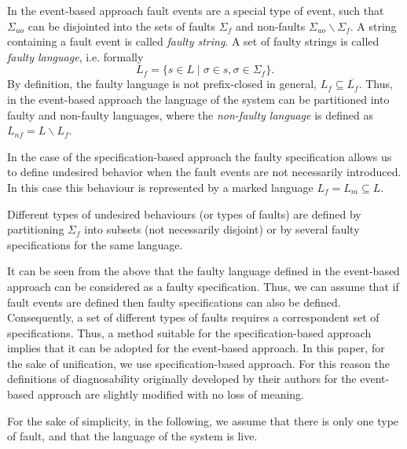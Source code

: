 \documentclass[a4paper, 10pt, conference]{ieeeconf} \IEEEoverridecommandlockouts
\begin{document}
In the event-based approach fault events are a special type of event, such that
$\Sigma_{uo}$ can be disjointed into the sets of faults $\Sigma_f$ and
non-faults $\Sigma_{uo}\backslash \Sigma_f$. A string containing a fault event
is called \emph{faulty string}. A set of faulty strings is called \emph{faulty
language}, i.e. formally $$L_f = \{ s \in L \mid \sigma \in s, \sigma \in
\Sigma_f\}.$$ By definition, the faulty language is not prefix-closed in
general, $L_f \subseteq \overline{L_f}$. Thus, in the event-based approach the
language of the system can be partitioned into faulty and non-faulty languages,
where the \emph{non-faulty language} is defined as $L_{nf} = L \backslash L_f$.

In the case of the specification-based approach the faulty specification allows
us to define undesired behavior when the fault events are not necessarily
introduced. In this case this behaviour is represented by a marked language $L_f
= L_m \subseteq L$. 

Different types of undesired behaviours (or types of faults) are defined by
partitioning $\Sigma_f$ into subsets (not necessarily disjoint) or by several
faulty specifications for the same language. 

It can be seen from the above that the faulty language defined in the
event-based approach can be considered as a faulty specification. Thus, we can
assume that if fault events are defined then faulty specifications can also be
defined. Consequently, a set of different types of faults requires a
correspondent set of specifications. Thus, a method suitable for the
specification-based approach implies that it can be adopted for the event-based
approach. In this paper, for the sake of unification, we use specification-based
approach. For this reason the definitions of diagnosability originally developed
by their authors for the event-based approach are slightly modified with no loss
of meaning. 

For the sake of simplicity, in the following, we assume that there is only one
type of fault, and that the language of the system is live.



\end{document}
